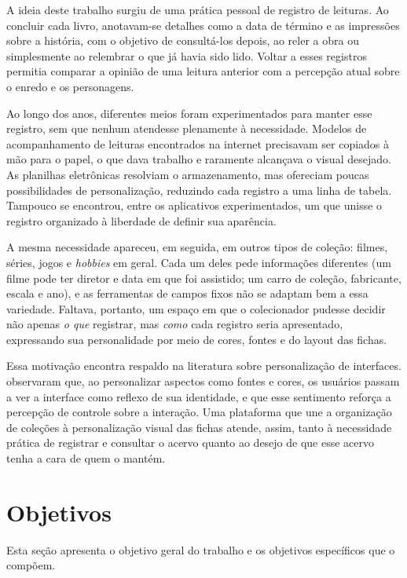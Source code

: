 A ideia deste trabalho surgiu de uma prática pessoal de registro de leituras. Ao concluir cada livro, anotavam-se detalhes como a data de término e as impressões sobre a história, com o objetivo de consultá-los depois, ao reler a obra ou simplesmente ao relembrar o que já havia sido lido. Voltar a esses registros permitia comparar a opinião de uma leitura anterior com a percepção atual sobre o enredo e os personagens.

Ao longo dos anos, diferentes meios foram experimentados para manter esse registro, sem que nenhum atendesse plenamente à necessidade. Modelos de acompanhamento de leituras encontrados na internet precisavam ser copiados à mão para o papel, o que dava trabalho e raramente alcançava o visual desejado. As planilhas eletrônicas resolviam o armazenamento, mas ofereciam poucas possibilidades de personalização, reduzindo cada registro a uma linha de tabela. Tampouco se encontrou, entre os aplicativos experimentados, um que unisse o registro organizado à liberdade de definir sua aparência.

A mesma necessidade apareceu, em seguida, em outros tipos de coleção: filmes, séries, jogos e \textit{hobbies} em geral. Cada um deles pede informações diferentes (um filme pode ter diretor e data em que foi assistido; um carro de coleção, fabricante, escala e ano), e as ferramentas de campos fixos não se adaptam bem a essa variedade. Faltava, portanto, um espaço em que o colecionador pudesse decidir não apenas \textit{o que} registrar, mas \textit{como} cada registro seria apresentado, expressando sua personalidade por meio de cores, fontes e do layout das fichas.

Essa motivação encontra respaldo na literatura sobre personalização de interfaces.  observaram que, ao personalizar aspectos como fontes e cores, os usuários passam a ver a interface como reflexo de sua identidade, e que esse sentimento reforça a percepção de controle sobre a interação. Uma plataforma que une a organização de coleções à personalização visual das fichas atende, assim, tanto à necessidade prática de registrar e consultar o acervo quanto ao desejo de que esse acervo tenha a cara de quem o mantém.

\section{Objetivos}

Esta seção apresenta o objetivo geral do trabalho e os objetivos específicos que o compõem.

